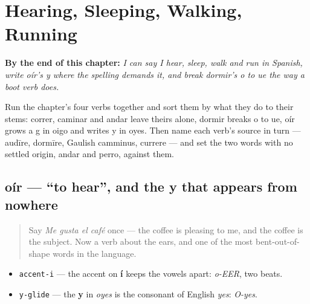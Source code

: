 
\chapter{Hearing, Sleeping, Walking, Running}
\label{ch:spanish-hear-sleep-walk-run}

\begin{chapteropening}
\textbf{By the end of this chapter:} \emph{I can say I hear, sleep, walk and run in Spanish, write oír's y where the spelling demands it, and break dormir's o to ue the way a boot verb does.}

Run the chapter's four verbs together and sort them by what they do to their stems: correr, caminar and andar leave theirs alone, dormir breaks o to ue, oír grows a g in oigo and writes y in oyes. Then name each verb's source in turn — audīre, dormīre, Gaulish camminus, currere — and set the two words with no settled origin, andar and perro, against them.
\end{chapteropening}

\section[oír]{oír — \textquotedblleft{}to hear\textquotedblright{}, and the y that appears from nowhere}

\label{lesson:ES-C36-oir}



\begin{quote}
Say \emph{Me gusta el café} once — the coffee is pleasing to me, and the coffee is the subject. Now a verb about the ears, and one of the most bent-out-of-shape words in the language.
\end{quote}

\begin{sounds}
\begin{itemize}
\raggedright
  \item \texttt{accent-i} — the accent on \textbf{í} keeps the vowels apart: \emph{o-EER}, two beats.
  \item \texttt{y-glide} — the \textbf{y} in \emph{oyes} is the consonant of English \emph{yes}: \emph{O-yes}.
\end{itemize}
\end{sounds}

